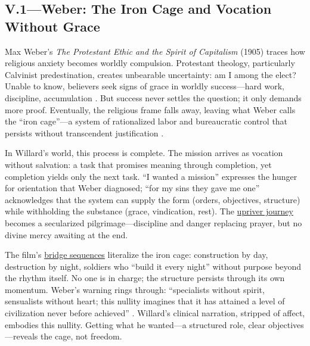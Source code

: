 \subsection*{V.1—Weber: The Iron Cage and Vocation Without Grace}
\label{ssec:v-weber}
Max Weber's \textit{The Protestant Ethic and the Spirit of Capitalism} (1905) traces how
religious anxiety becomes worldly compulsion. Protestant theology, particularly Calvinist
predestination, creates unbearable uncertainty: am I among the elect? Unable to know, believers
seek signs of grace in worldly success---hard work, discipline, accumulation
\parencite{WeberProtestant2002}. But success never settles the question; it only demands more
proof. Eventually, the religious frame falls away, leaving what Weber calls the ``iron
cage''---a system of rationalized labor and bureaucratic control that persists without
transcendent justification \parencite{WeberProtestant2002}.

In Willard's world, this process is complete. The mission arrives as vocation without
salvation: a task that promises meaning through completion, yet completion yields only the next
task. ``I wanted a mission'' expresses the hunger for orientation that Weber diagnosed; ``for
my sins they gave me one'' acknowledges that the system can supply the form (orders,
objectives, structure) while withholding the substance (grace, vindication, rest). The
\hyperref[scene:upriver-journey]{upriver journey} becomes a secularized pilgrimage---discipline
and danger replacing prayer, but no divine mercy awaiting at the end.

The film's \hyperref[scene:do-lung-bridge]{bridge sequences} literalize the iron cage:
construction by day, destruction by night, soldiers who ``build it every night'' without
purpose beyond the rhythm itself. No one
is in charge; the structure persists through its own momentum. Weber's warning rings through:
``specialists without spirit, sensualists without heart; this nullity imagines that it has
attained a level of civilization never before achieved'' \parencite{WeberProtestant2002}.
Willard's clinical narration, stripped of affect, embodies this nullity. Getting what he
wanted---a structured role, clear objectives---reveals the cage, not freedom.
